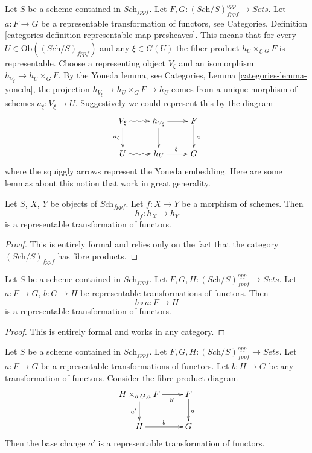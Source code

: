 \noindent
Let $S$ be a scheme contained in $\textit{Sch}_{fppf}$.
Let $F, G : (\textit{Sch}/S)_{fppf}^{opp} \to \textit{Sets}$.
Let $a : F \to G$ be a representable transformation of functors, see
Categories,
Definition \ref{categories-definition-representable-map-presheaves}.
This means that for every
$U \in \text{Ob}((\textit{Sch}/S)_{fppf})$ and
any $\xi \in G(U)$ the fiber product $h_U \times_{\xi, G} F$ is representable.
Choose a representing object $V_\xi$ and an isomorphism
$h_{V_\xi} \to h_U \times_G F$.
By the Yoneda lemma, see Categories, Lemma \ref{categories-lemma-yoneda},
the projection $h_{V_\xi} \to h_U \times_G F \to h_U$ comes from a unique
morphism of schemes $a_\xi : V_\xi \to U$.
Suggestively we could represent this by the diagram
$$
\xymatrix{
V_\xi \ar@{~>}[r] \ar[d]_{a_\xi} & h_{V_\xi} \ar[d] \ar[r] & F \ar[d]^a \\
U \ar@{~>}[r] & h_U \ar[r]^\xi & G
}
$$
where the squiggly arrows represent the Yoneda embedding.
Here are some lemmas about this notion that work in great generality.

\begin{lemma}
\label{lemma-morphism-schemes-gives-representable-transformation}
Let $S$, $X$, $Y$ be objects of $\textit{Sch}_{fppf}$.
Let $f : X \to Y$ be a morphism of schemes.
Then
$$
h_f : h_X \longrightarrow h_Y
$$
is a representable transformation of functors.
\end{lemma}

\begin{proof}
This is entirely formal and relies only on the fact that
the category $(\textit{Sch}/S)_{fppf}$ has fibre products.
\end{proof}

\begin{lemma}
\label{lemma-composition-representable-transformations}
Let $S$ be a scheme contained in $\textit{Sch}_{fppf}$.
Let $F, G, H : (\textit{Sch}/S)_{fppf}^{opp} \to \textit{Sets}$.
Let $a : F \to G$, $b : G \to H$ be representable transformations of functors.
Then
$$
b \circ a : F \longrightarrow H
$$
is a representable transformation of functors.
\end{lemma}

\begin{proof}
This is entirely formal and works in any category.
\end{proof}

\begin{lemma}
\label{lemma-base-change-representable-transformations}
Let $S$ be a scheme contained in $\textit{Sch}_{fppf}$.
Let $F, G, H : (\textit{Sch}/S)_{fppf}^{opp} \to \textit{Sets}$.
Let $a : F \to G$ be a representable transformations of functors.
Let $b : H \to G$ be any transformation of functors.
Consider the fibre product diagram
$$
\xymatrix{
H \times_{b, G, a} F \ar[r]_-{b'} \ar[d]_{a'} & F \ar[d]^a \\
H \ar[r]^b & G
}
$$
Then the base change $a'$ is a representable transformation of functors.
\end{lemma}

